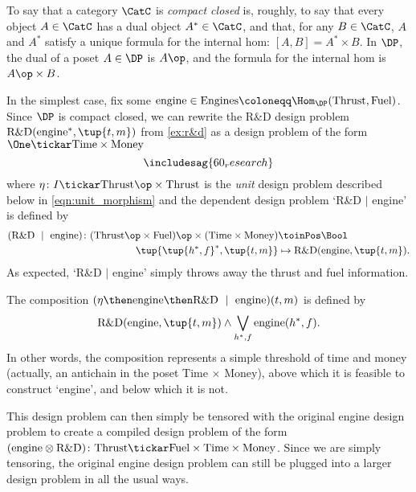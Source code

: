 To say that a category $\CatC$ is \emph{compact closed} is, roughly, to say that every object $A \in \CatC$ has a dual object $A^* \in \CatC$, and that, for any $B \in \CatC$, $A$ and $A^*$ satisfy a unique formula for the internal hom: $[A,B] = A^* \times B$. In $\DP$, the dual of a poset $A \in \DP$ is $A\op$, and the formula for the internal hom is $A\op \times B$.

\begin{example}\label{ex:r&dproblem}
In the simplest case, fix some $\text{engine} \in \text{Engines} \coloneqq \Hom_\DP(\text{Thrust},\text{Fuel})$. Since $\DP$ is compact closed, we can rewrite the R\&D design problem $\text{R\&D}(\text{engine}^*, \tup{t,m})$ from \cref{ex:r&d} as a design problem of the form $\One \tickar \text{Time} \times \text{Money}$
\begin{equation*}
\includesag{60_research}
\end{equation*}
where $\eta \colon I \tickar \text{Thrust}\op \times \text{Thrust}$ is the \emph{unit} design problem described below in \cref{eqn:unit_morphism} and the dependent design problem `R\&D $\mid$ engine' is defined by
\begin{align*}
(\text{R\&D } \mid \text{ engine}) \colon (\text{Thrust}\op \times \text{Fuel})\op \times (\text{Time} \times \text{Money}) &\toinPos \Bool \\
\tup{\tup{h^*, f}^*, \tup{t,m}} &\mapsto \text{R\&D}(\text{engine}, \tup{t,m}).
\end{align*}
As expected, `R\&D $|$ engine' simply throws away the thrust and fuel information.

The composition $(\eta \then \text{engine} \then \text{R\&D } \mid \text{ engine}) (t,m)$ is defined by
\begin{equation*}
    \text{R\&D}(\text{engine}, \tup{t,m}) \wedge \bigvee_{h^*,f} \text{engine}(h^*, f).
\end{equation*} 
In other words, the composition represents a simple threshold of time and money (actually, an antichain in the poset Time $\times$ Money), above which it is feasible to construct `engine', and below which it is not.

This design problem can then simply be tensored with the original engine design problem to create a compiled design problem of the form $(\text{engine} \otimes \text{R\&D}) \colon \text{Thrust} \tickar \text{Fuel} \times \text{Time} \times \text{Money}$. Since we are simply tensoring, the original engine design problem can still be plugged into a larger design problem in all the usual ways.
\end{example}

